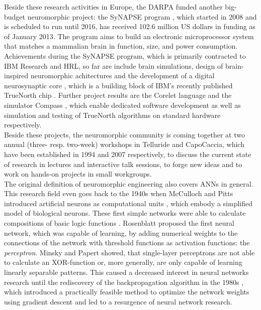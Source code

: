 Beside these research activities in Europe, the \ac{DARPA} funded another big-budget neuromorphic project: the \ac{SyNAPSE} program \cite{SYNAPSE-proj, Srinivasa2012}, which started in 2008 and is scheduled to run until 2016, has received 102.6 million US dollars in funding as of January 2013. 
The program aims to build an electronic microprocessor system that matches a mammalian brain in function, size, and power consumption.
Achievements during the \ac{SyNAPSE} program, which is primarily contracted to IBM Research and \acs{HRL}, so far are include brain simulations, design of brain-inspired neuromorphic achitectures \cite{Nere2012} and the development of a digital neurosynaptic core \cite{Merolla2011}, which is a building block of IBM's recently published TrueNorth chip \cite{Akopyan2015}.
Further project results are the Corelet language \cite{Amir2013} and the simulator Compass \cite{Preissl2012}, which enable dedicated software development as well as simulation and testing of TrueNorth algorithms on standard hardware respectively.\\
Beside these projects, the neuromorphic community is coming together at two annual (three- resp. two-week) workshops in Telluride and CapoCaccia, which have been established in 1994 and 2007 respectively, to discuss the current state of research in lectures and interactive talk sessions, to forge new ideas and to work on hands-on projects in small workgroups.\\
The original definition of neuromorphic engineering also covers \acp{ANN} in general.
This research field even goes back to the 1940s when McCulloch and Pitts introduced artificial neurons as computational units \cite{McCulloch1988}, which embody a simplified model of biological neurons.
These first simple networks were able to calculate compositions of basic logic functions \cite{McCulloch1988, Rojas1996}.
Rosenblatt \cite{Rosenblatt58} proposed the first neural network, which was capable of learning, by adding numerical weights to the connections of the network with threshold functions as activation functions: the \textit{perceptron}.
Minsky and Papert \cite{Minsky1969} showed, that single-layer perceptrons are not able to calculate an XOR-function or, more generally, are only capable of learning linearly separable patterns.
This caused a decreased interest in neural networks research until the rediscovery of the backpropagation algorithm \cite{Werbos1974} in the 1980s \cite{Rumelhart1988}, which introduced a practically feasible method to optimize the network weights using gradient descent and led to a resurgence of neural network research.
